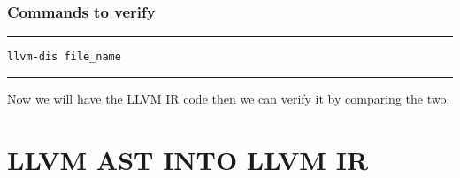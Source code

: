\documentclass{book}
\begin{document}
\subsection{Commands to verify}
\noindent\rule{12cm}{0.4pt}

\begin{verbatim}
llvm-dis file_name
\end{verbatim}

\noindent\rule{12cm}{0.4pt}\newline

Now we will have the LLVM IR code then we can verify it by comparing the two.

\chapter{LLVM AST INTO LLVM IR}
\end{document}
